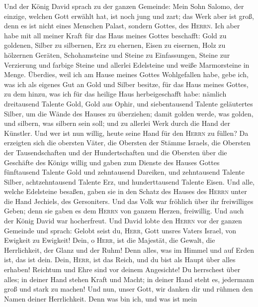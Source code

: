  Und der König David sprach zu der ganzen Gemeinde: Mein
Sohn Salomo, der einzige, welchen Gott erwählt hat, ist noch jung und
zart; das Werk aber ist groß, denn es ist nicht eines Menschen Palast,
sondern Gottes, des \textsc{Herrn}.  Ich aber habe mit all
meiner Kraft für das Haus meines Gottes beschafft: Gold zu goldenen,
Silber zu silbernen, Erz zu ehernen, Eisen zu eisernen, Holz zu
hölzernen Geräten, Schohamsteine und Steine zu Einfassungen, Steine zur
Verzierung und farbige Steine und allerlei Edelsteine und weiße
Marmorsteine in Menge.  Überdies, weil ich am Hause meines
Gottes Wohlgefallen habe, gebe ich, was ich als eigenes Gut an Gold und
Silber besitze, für das Haus meines Gottes, zu dem hinzu, was ich für
das heilige Haus herbeigeschafft habe:  nämlich
dreitausend Talente Gold, Gold aus Ophir, und siebentausend Talente
geläutertes Silber, um die Wände des Hauses zu überziehen;
 damit golden werde, was golden, und silbern, was silbern
sein soll; und zu allerlei Werk durch die Hand der Künstler. Und wer ist
nun willig, heute seine Hand für den \textsc{Herrn} zu füllen?
 Da erzeigten sich die obersten Väter, die Obersten der
Stämme Israels, die Obersten der Tausendschaften und der Hundertschaften
und die Obersten über die Geschäfte des Königs willig  und
gaben zum Dienste des Hauses Gottes fünftausend Talente Gold und
zehntausend Dareiken, und zehntausend Talente Silber, achtzehntausend
Talente Erz, und hunderttausend Talente Eisen.  Und alle,
welche Edelsteine besaßen, gaben sie in den Schatz des Hauses des
\textsc{Herrn} unter die Hand Jechiels, des Gersoniters. 
Und das Volk war fröhlich über ihr freiwilliges Geben; denn sie gaben es
dem \textsc{Herrn} von ganzem Herzen, freiwillig. Und auch der König
David war hocherfreut.  Und David lobte den
\textsc{Herrn} vor der ganzen Gemeinde und sprach: Gelobt seist du,
\textsc{Herr}, Gott unsres Vaters Israel, von Ewigkeit zu Ewigkeit!
 Dein, o \textsc{Herr}, ist die Majestät, die Gewalt, die
Herrlichkeit, der Glanz und der Ruhm! Denn alles, was im Himmel und auf
Erden ist, das ist dein. Dein, \textsc{Herr}, ist das Reich, und du bist
als Haupt über alles erhaben!  Reichtum und Ehre sind vor
deinem Angesichte! Du herrschest über alles; in deiner Hand stehen Kraft
und Macht; in deiner Hand steht es, jedermann groß und stark zu machen!
 Und nun, unser Gott, wir danken dir und rühmen den Namen
deiner Herrlichkeit.  Denn was bin ich, und was ist mein
